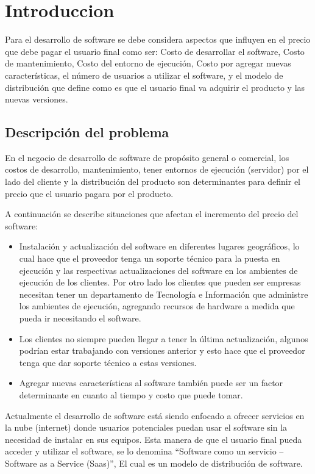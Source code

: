 \chapter{Introduccion}
\noindent Para el desarrollo de software se debe considera aspectos que influyen en el precio que debe pagar el usuario final como ser: Costo de desarrollar el software, Costo de mantenimiento, Costo del entorno de ejecución,  Costo por agregar nuevas características, el número de usuarios a utilizar el software, y el modelo de distribución que define como es que el usuario final va adquirir el producto y las nuevas versiones. 

\section{Descripción del problema}
\noindent En el negocio de desarrollo de software de propósito general o comercial, los costos de desarrollo, mantenimiento, tener  entornos de ejecución (servidor) por el lado del cliente y la distribución del producto son determinantes para definir el precio que el usuario pagara por el producto.

\noindent A continuación se describe situaciones que afectan el incremento del precio del software:

\begin{itemize}
   	\item Instalación y actualización del software en diferentes lugares geográficos, lo cual hace que el proveedor tenga un soporte técnico para la puesta en ejecución y 	 las respectivas actualizaciones del software en los ambientes de ejecución de los clientes. Por otro lado los clientes que pueden ser empresas necesitan tener un departamento de Tecnología e Información que administre los ambientes de ejecución, agregando recursos de hardware a medida que pueda ir necesitando el software.
    \item Los clientes no siempre pueden llegar a tener la última actualización, algunos podrían estar trabajando con versiones anterior y esto hace que el proveedor tenga que dar soporte técnico a estas versiones.
    \item Agregar nuevas características al software también puede ser un factor determinante en cuanto al tiempo y costo que puede tomar.

\end{itemize}

\noindent Actualmente el desarrollo de software está siendo enfocado a ofrecer servicios en la nube (internet) donde usuarios potenciales puedan usar el software sin la necesidad de instalar en sus equipos. Esta manera de que el usuario final pueda acceder y utilizar el software, se lo denomina “Software como un servicio – Software as a Service (Saas)”, El cual es un modelo de distribución de software.

